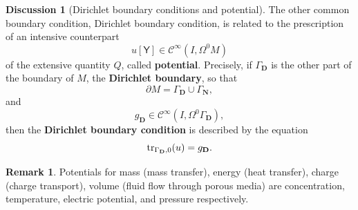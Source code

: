 \documentclass{elsarticle}
\theoremstyle{definition}
\newtheorem{discussion}[theorem]{Discussion}
\newtheorem{remark}[theorem]{Remark}
\newcommand{\tr}{\mathop{\rm tr}\nolimits}
\newcommand{\newterm}[1]{\textbf{#1}}
\newcommand{\potential}{\mathsf{Y}}
\newcommand{\Dirichlet}{\mathbf{D}}
\newcommand{\Neumann}{\mathbf{N}}
\begin{document}
\begin{discussion}[Dirichlet boundary conditions and potential]
  The other common boundary condition, Dirichlet boundary condition, is related to the prescription of an intensive counterpart
  \begin{equation}
    \label{eq:continuum/potential_definition}
    u [\potential] \in \mathcal{C}^\infty(I, \Omega^0 M)
  \end{equation}
  of the extensive quantity $Q$, called \newterm{potential}.
  Precisely, if $\Gamma_{\Dirichlet}$ is the other part of the boundary of $M$, the \newterm{Dirichlet boundary}, so that
  \begin{equation}
    \label{eq:continuum/boundary_decomposition}
    \partial M = \Gamma_{\Dirichlet} \cup \Gamma_{\Neumann},
  \end{equation}
  and
  \begin{equation}
    \label{eq:continuum/prescribed_dirichlet_condition_definition}
    g_{\Dirichlet} \in \mathcal{C}^\infty(I, \Omega^0 \Gamma_{\Dirichlet}),
  \end{equation}
  then the \newterm{Dirichlet boundary condition} is described by the equation
  \begin{equation}
    \label{eq:continuum/dirichlet_boundary_condition}
    \tr_{\Gamma_{\Dirichlet}, 0}(u) = g_{\Dirichlet}.
  \end{equation}
\end{discussion}
\begin{remark}
  Potentials for mass (mass transfer), energy (heat transfer), charge (charge transport), volume (fluid flow through porous media) are concentration, temperature, electric potential, and pressure respectively.
\end{remark}
\end{document}
